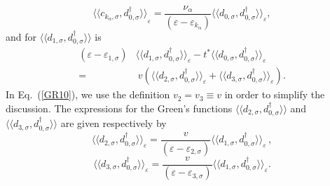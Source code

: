 \documentclass[aps,twocolumn,prb,superscript,floatfix,superscriptaddress,showpacs]{revtex4-1}
\newcommand{\ve}{\varepsilon}
\newcommand{\la}{\langle}
\newcommand{\ra}{\rangle}
\begin{document}
\begin{equation}
{\la\la c_{k_{\alpha},\sigma}, d_{0,\sigma}^{\dagger}\ra\ra}_{\ve}=\frac{\nu_{\alpha}}{\left(\ve-\ve_{k_{\alpha}}\right)}\la\la d_{0, \sigma}, d_{0, \sigma}^{\dagger}\ra\ra_{\ve},
\end{equation}
and for $\la\la d_{1,\sigma}, d_{0,\sigma}^{\dagger}\ra\ra$ is
\begin{equation}
\begin{aligned}
\left(\ve-\ve_{1,\sigma}\right)&\la\la d_{1, \sigma}, d_{0, \sigma}^{\dagger}\ra\ra_{\ve}-t^{*}\la\la d_{0,\sigma}, d_{0,\sigma}^{\dagger}\ra\ra_{\ve} \\ = & \ v\left(\la\la d_{2,\sigma}, d_{0,\sigma}^{\dagger}\ra\ra_{\ve} + \la\la d_{3,\sigma}, d_{0,\sigma}^{\dagger}\ra\ra_{\ve}\right).
\end{aligned}\label{GR10}
\end{equation}
In Eq.\ (\ref{GR10}), we use the definition $v_{2}=v_{3}\equiv v$ in order to simplify the discussion. The expressions for the Green's functions $\la\la d_{2,\sigma}, d_{0,\sigma}^{\dagger}\ra\ra$ and $\la\la d_{3,\sigma}, d_{0,\sigma}^{\dagger}\ra\ra$ are given respectively by
\begin{equation}
\la\la d_{2,\sigma}, d_{0,\sigma}^{\dagger}\ra\ra_{\ve}=\frac{v}{\left(\ve-\ve_{2,\sigma}\right)}\la\la d_{1,\sigma},d_{0,\sigma}^{\dagger} \ra\ra_{\ve} \label{GR20}\,,
\end{equation}
\begin{equation}
\la\la d_{3,\sigma}, d_{0,\sigma}^{\dagger}\ra\ra_{\ve}=\frac{v}{\left(\ve-\ve_{3,\sigma}\right)}\la\la d_{1,\sigma},d_{0,\sigma}^{\dagger} \ra\ra_{\ve}. \label{GR30}
\end{equation}
\end{document}
